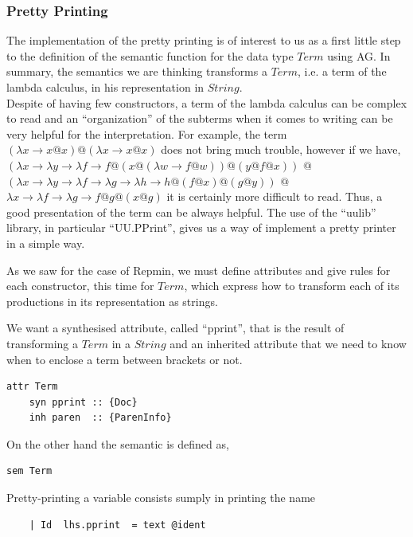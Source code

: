 \documentclass[a4paper,10pt]{article}
\begin{document}
\subsubsection{Pretty Printing}

The implementation of the pretty printing is of interest to us as a first little step to
the definition of the semantic function for the data type $Term$ using AG. In
summary, the semantics we are thinking transforms a $Term$, i.e. a term
of the lambda calculus, in his representation in $String$.\\

Despite of having few constructors, a term of the lambda calculus can be complex
to read and an ``organization'' of the subterms when it comes to writing can be
very helpful for the interpretation. For example, the term 
$(\lambda x \rightarrow x@x)@(\lambda x \rightarrow x@x)$
does not bring much trouble, however if we have,
$(\lambda x \rightarrow
	\lambda y \rightarrow
		\lambda f \rightarrow f @ (x @ (\lambda w \rightarrow f @ w)) @ (y @ f @ x))$
$@$
$(\lambda x \rightarrow 
	\lambda y \rightarrow \lambda f \rightarrow 
	\lambda g \rightarrow \lambda h \rightarrow h @ (f @ x) @ (g @ y))$
$@$ $\lambda x \rightarrow \lambda f \rightarrow 
		\lambda g \rightarrow f @ g @ (x @ g)$
it is certainly more difficult to read. Thus, a good presentation of the term can be always
helpful. The use of the ``uulib'' library, in particular ``UU.PPrint'', gives us
a way of implement a pretty printer in a simple way.

As we saw for the case of Repmin, we must define attributes and give rules for
each constructor, this time for $Term$, which express how to transform each of its productions
in its representation as strings.

We want a synthesised attribute, called ``pprint'', that is the result
of transforming a $Term$ in a $String$ and an inherited attribute that we need to
know when to enclose a term between brackets or not.

\begin{lstlisting}
attr Term 
    syn pprint :: {Doc}
    inh paren  :: {ParenInfo}
\end{lstlisting}

\noindent On the other hand the semantic is defined as,

\begin{lstlisting}    
sem Term
\end{lstlisting}
Pretty-printing a variable consists sumply in printing the name
\begin{lstlisting}    
    | Id  lhs.pprint  = text @ident
\end{lstlisting}
\end{document}
